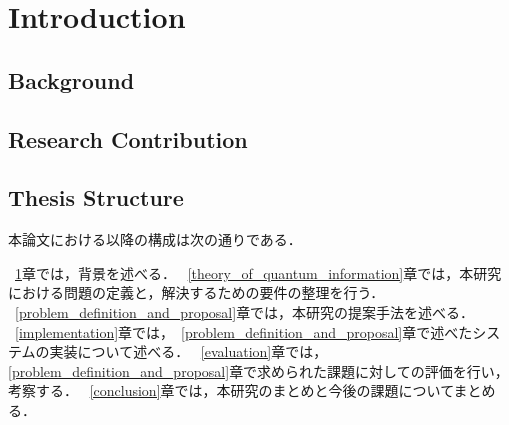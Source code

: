 \section{Introduction}
\label{introduction}

\subsection{Background}
\label{introduction:background}


\subsection{Research Contribution}
\label{introduction:research_contribution}

\subsection{Thesis Structure}
\label{introduction:thesis_structure}

本論文における以降の構成は次の通りである．

~\ref{introduction}章では，背景を述べる．
~\ref{theory_of_quantum_information}章では，本研究における問題の定義と，解決するための要件の整理を行う．
~\ref{problem_definition_and_proposal}章では，本研究の提案手法を述べる．
~\ref{implementation}章では，~\ref{problem_definition_and_proposal}章で述べたシステムの実装について述べる．
~\ref{evaluation}章では，\ref{problem_definition_and_proposal}章で求められた課題に対しての評価を行い，考察する．
~\ref{conclusion}章では，本研究のまとめと今後の課題についてまとめる．


